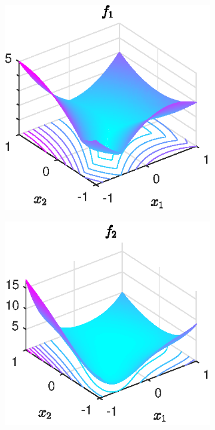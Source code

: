 \begin{figure}[H]%
	\begin{subfigure}[t]{0.32\textwidth}
		\includegraphics[width=\textwidth]{Pictures/Plots/testfun_f1.eps}
	\end{subfigure}
	\begin{subfigure}[t]{0.32\textwidth}
		\includegraphics[width=\textwidth]{Pictures/Plots/testfun_f2.eps}

\end{subfigure}
\end{figure}
